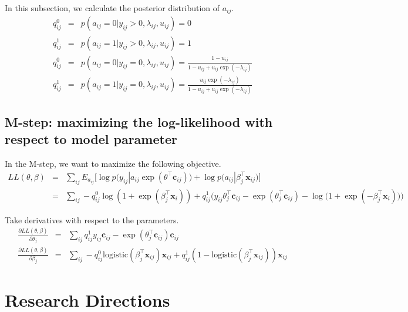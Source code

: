 \documentclass{article}
\begin{document}
In this subsection, we calculate the posterior distribution of $a_{ij}$.
\begin{eqnarray}
q_{ij}^{0} &=& p(a_{ij} = 0 | y_{ij} > 0, \lambda_{ij}, u_{ij}) =  0 \\
q_{ij}^{1} &=& p(a_{ij} = 1 | y_{ij} > 0, \lambda_{ij}, u_{ij}) =  1 \\[10pt]
q_{ij}^{0} &=& p(a_{ij} = 0 | y_{ij} = 0, \lambda_{ij}, u_{ij}) =  \frac{1 - u_{ij}}{1 - u_{ij} + u_{ij}\exp(-\lambda_{ij})} \\
q_{ij}^{1} &=& p(a_{ij} = 1 | y_{ij} = 0, \lambda_{ij}, u_{ij}) =  \frac{u_{ij}\exp(-\lambda_{ij})}{1 - u_{ij} + u_{ij}\exp(-\lambda_{ij})}
\end{eqnarray}


\subsection{M-step: maximizing the log-likelihood with respect to model parameter}

In the M-step, we want to maximize the following objective. 
\begin{eqnarray}
LL(\theta, \beta) &=& \sum_{ij} E_{a_{ij}} \Big[\log p\big(y_{ij} | a_{ij} \exp(\theta^\top \mathbf{c}_{ij})\big) + \log p\big(a_{ij} | \beta_j^\top \mathbf{x}_{ij}\big)\Big] \nonumber\\
&=& \sum_{ij}  - q_{ij}^0 \log (1 +  \exp(\beta_j^\top \mathbf{x}_i)) + q_{ij}^1 \Big( y_{ij}\theta_{j}^\top \mathbf{c}_{ij} - \exp(\theta_{j}^\top \mathbf{c}_{ij}) - \log \big(1 + \exp( - \beta_j^\top \mathbf{x}_i) \big) \Big) \nonumber
\end{eqnarray}

Take derivatives with respect to the parameters. 
\begin{eqnarray}
\frac{\partial LL(\theta, \beta)}{\partial \theta_j} &=& \sum_{ij} q_{ij}^1 y_{ij} \mathbf{c}_{ij} - \exp(
\theta_j^\top \mathbf{c}_{ij}) \mathbf{c}_{ij} \\
\frac{\partial LL(\theta, \beta)}{\partial \beta_j} &=& \sum_{ij} - q_{ij}^0 \mathrm{logistic}(\beta_j^\top \mathbf{x}_{ij}) \mathbf{x}_{ij} + q_{ij}^1 (1 - \mathrm{logistic}(\beta_j^\top \mathbf{x}_{ij})) \mathbf{x}_{ij}
\end{eqnarray}



\section{Research Directions}
\end{document}

